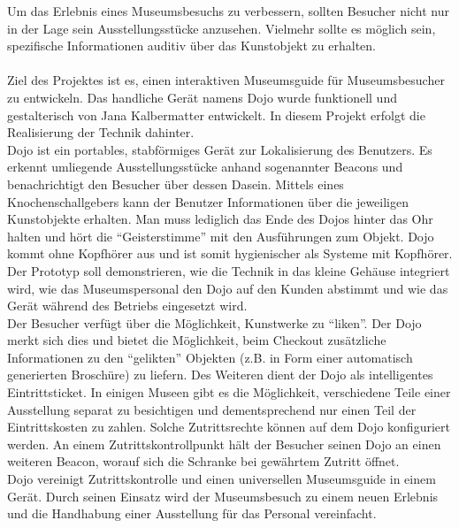 Um das Erlebnis eines Museumsbesuchs zu verbessern, sollten Besucher nicht nur in der Lage sein Ausstellungsstücke anzusehen. Vielmehr sollte es möglich sein, spezifische Informationen auditiv über das Kunstobjekt zu erhalten.\\\\
Ziel des Projektes ist es, einen interaktiven Museumsguide für Museumsbesucher zu entwickeln. Das handliche Gerät namens Dojo wurde funktionell und gestalterisch von Jana Kalbermatter entwickelt. In diesem Projekt erfolgt die Realisierung der Technik dahinter. \\
Dojo ist ein portables, stabförmiges Gerät zur Lokalisierung des Benutzers. Es erkennt umliegende Ausstellungsstücke anhand sogenannter Beacons und benachrichtigt den Besucher über dessen Dasein. Mittels eines Knochenschallgebers kann der Benutzer Informationen über die jeweiligen Kunstobjekte erhalten. Man muss lediglich das Ende des Dojos hinter das Ohr halten und hört die ``Geisterstimme'' mit den Ausführungen zum Objekt. Dojo kommt ohne Kopfhörer aus und ist somit hygienischer als Systeme mit Kopfhörer.
Der Prototyp soll demonstrieren, wie die Technik in das kleine Gehäuse integriert wird, wie das Museumspersonal den Dojo auf den Kunden abstimmt und wie das Gerät während des Betriebs eingesetzt wird.\\
Der Besucher verfügt über die Möglichkeit, Kunstwerke zu ``liken''. Der Dojo merkt sich dies und bietet die Möglichkeit, beim Checkout zusätzliche Informationen zu den ``gelikten'' Objekten (z.B. in Form einer automatisch generierten Broschüre) zu liefern.
Des Weiteren dient der Dojo als intelligentes Eintrittsticket. In einigen Museen gibt es die Möglichkeit, verschiedene Teile einer Ausstellung separat zu besichtigen und dementsprechend nur einen Teil der Eintrittskosten zu zahlen. Solche Zutrittsrechte können auf dem Dojo konfiguriert werden. An einem Zutrittskontrollpunkt hält der Besucher seinen Dojo an einen weiteren Beacon, worauf sich die Schranke bei gewährtem Zutritt öffnet.\\

Dojo vereinigt Zutrittskontrolle und einen universellen Museumsguide in einem Gerät. Durch seinen Einsatz wird der Museumsbesuch zu einem neuen Erlebnis und die Handhabung einer Ausstellung für das Personal vereinfacht.

